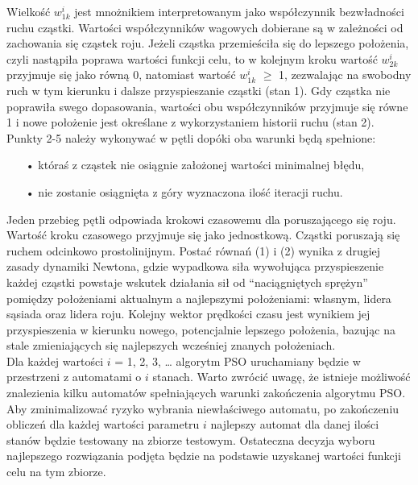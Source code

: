 \documentclass{llncs}
\begin{document}
Wielkość $w_{1k}^i$ jest mnożnikiem interpretowanym jako współczynnik bezwładności ruchu cząstki. Wartości współczynników wagowych dobierane są w zależności od zachowania się cząstek roju. Jeżeli cząstka przemieściła się do lepszego położenia, czyli nastąpiła poprawa wartości funkcji celu, to w kolejnym kroku wartość $w_{2k}^i$  przyjmuje się jako równą 0, natomiast wartość $w_{1k}^i$ $\geq$ 1, zezwalając na swobodny ruch w tym kierunku i dalsze przyspieszanie cząstki (stan 1). Gdy cząstka nie poprawiła swego dopasowania, wartości obu współczynników przyjmuje się równe 1 i nowe położenie jest określane z wykorzystaniem historii ruchu (stan 2).\\

Punkty 2-5 należy wykonywać w pętli dopóki oba warunki będą spełnione:

\begin{itemize}
\item[•] któraś z cząstek nie osiągnie założonej wartości minimalnej błędu,
\item[•] nie zostanie osiągnięta z góry wyznaczona ilość iteracji ruchu.
\end{itemize}

Jeden przebieg pętli odpowiada krokowi czasowemu dla poruszającego się roju. Wartość kroku czasowego przyjmuje się jako jednostkową.
Cząstki poruszają się ruchem odcinkowo prostolinijnym. Postać równań (1) i (2) wynika z drugiej zasady dynamiki Newtona, gdzie wypadkowa siła wywołująca przyspieszenie każdej cząstki powstaje wskutek działania sił od “naciągniętych sprężyn” pomiędzy położeniami aktualnym a najlepszymi położeniami: własnym, lidera sąsiada oraz lidera roju. Kolejny wektor prędkości czasu jest wynikiem jej przyspieszenia w kierunku nowego, potencjalnie lepszego położenia, bazując na stale zmieniających się najlepszych wcześniej znanych położeniach.\\

Dla każdej wartości $i$ = 1, 2, 3, …  algorytm PSO uruchamiany będzie w przestrzeni z automatami o $i$ stanach. Warto zwrócić uwagę, że istnieje możliwość znalezienia kilku automatów spełniających warunki zakończenia algorytmu PSO. Aby zminimalizować ryzyko wybrania niewłaściwego automatu, po zakończeniu obliczeń dla każdej wartości parametru $i$ najlepszy automat dla danej ilości stanów będzie testowany na zbiorze testowym. Ostateczna decyzja wyboru najlepszego rozwiązania podjęta będzie na podstawie uzyskanej wartości funkcji celu na tym zbiorze.
\end{document}
